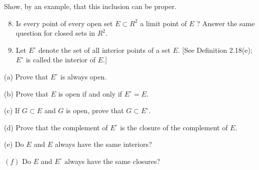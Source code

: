 \documentclass[10pt]{article}
\begin{document}
Show, by an example, that this inclusion can be proper.

\begin{enumerate}
  \setcounter{enumi}{7}
  \item Is every point of every open set $E \subset R^{2}$ a limit point of $E$ ? Answer the same question for closed sets in $R^{2}$.

  \item Let $E^{\circ}$ denote the set of all interior points of a set $E$. [See Definition 2.18(e); $E^{\circ}$ is called the interior of $E$.]

\end{enumerate}

(a) Prove that $E^{\circ}$ is always open.

(b) Prove that $E$ is open if and only if $E^{\circ}=E$.

(c) If $G \subset E$ and $G$ is open, prove that $G \subset E^{\circ}$.

(d) Prove that the complement of $E^{\circ}$ is the closure of the complement of $E$.

(e) Do $E$ and $E$ always have the same interiors?

$(f)$ Do $E$ and $E^{\circ}$ always have the same closures?
\end{document}
